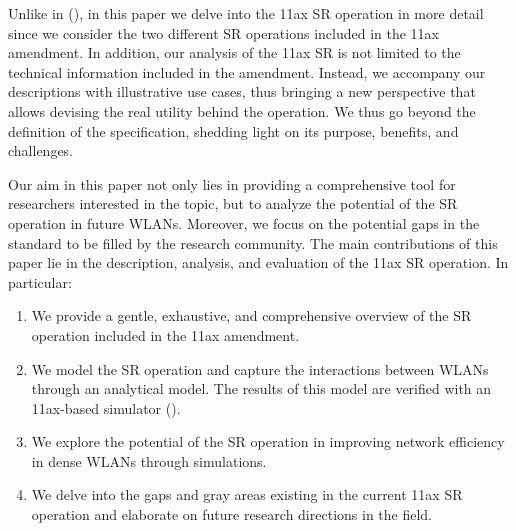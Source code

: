 \documentclass[preprint,12pt]{elsarticle}
\begin{document}
	Unlike in (\citealp{mori2014performance, qu2018survey, shen2018research}), in this paper we delve into the 11ax SR operation in more detail since we consider the two different SR operations included in the 11ax amendment. In addition, our analysis of the 11ax SR is not limited to the technical information included in the amendment. Instead, we accompany our descriptions with illustrative use cases, thus bringing a new perspective that allows devising the real utility behind the operation. We thus go beyond the definition of the specification, shedding light on its purpose, benefits, and challenges.
	
	Our aim in this paper not only lies in providing a comprehensive tool for researchers interested in the topic, but to analyze the potential of the SR operation in future WLANs. Moreover, we focus on the potential gaps in the standard to be filled by the research community. The main contributions of this paper lie in the description, analysis, and evaluation of the 11ax SR operation. In particular:
	\begin{enumerate}
		\item We provide a gentle, exhaustive, and comprehensive overview of the SR operation included in the 11ax amendment.
		\item We model the SR operation and capture the interactions between WLANs through an analytical model. The results of this model are verified with an 11ax-based simulator (\citealp{barrachina2019komondor}).
		\item We explore the potential of the SR operation in improving network efficiency in dense WLANs through simulations. %
		\item We delve into the gaps and gray areas existing in the current 11ax SR operation and elaborate on future research directions in the field. %
	\end{enumerate}
	
\end{document}
